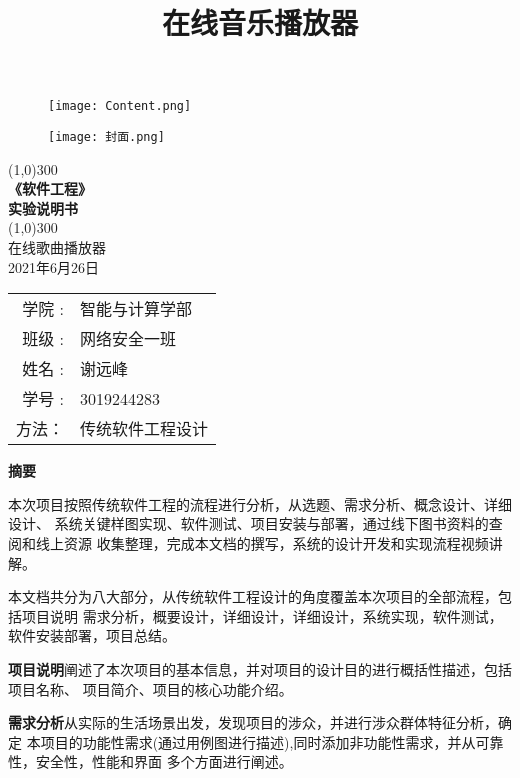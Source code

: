 \documentclass[UTF8,14pt]{article}
\title{在线音乐播放器}
\numberwithin{figure}{subsubsection}
\numberwithin{table}{subsubsection}
\begin{document}
\begin{titlepage}
	\begin{center}
		\begin{figure}[H]
			\centering
			\texttt{[image: Content.png]}
		\end{figure}
		\begin{figure}[H]
			\centering
			\texttt{[image: 封面.png]}
		\end{figure}
		\vspace*{2cm}
		\line(1,0){300}\\
		[-0.2cm]
		\Huge{\bfseries 《软件工程》\\实验说明书}\\
		\vspace*{-0.7cm}
		\line(1,0){300}\\
		\LARGE {在线歌曲播放器\\
			2021年6月26日}\\
		[0.6cm]
		\Large{
			\begin{tabular}{rl}
				学院 :        & 智能与计算学部   \\
				班级 :        & 网络安全一班     \\
				姓名        : & 谢远峰           \\
				学号       :  & 3019244283       \\
				方法：        & 传统软件工程设计
			\end{tabular}
		}
	\end{center}

\end{titlepage}
\clearpage
\centerline{\Large{\bfseries{摘要}}}
\vspace*{0.5cm}
本次项目按照传统软件工程的流程进行分析，从选题、需求分析、概念设计、详细设计、
系统关键样图实现、软件测试、项目安装与部署，通过线下图书资料的查阅和线上资源
收集整理，完成本文档的撰写，系统的设计开发和实现流程视频讲解。

本文档共分为八大部分，从传统软件工程设计的角度覆盖本次项目的全部流程，包括项目说明
需求分析，概要设计，详细设计，详细设计，系统实现，软件测试，软件安装部署，项目总结。

{\bfseries{项目说明}}阐述了本次项目的基本信息，并对项目的设计目的进行概括性描述，包括项目名称、
项目简介、项目的核心功能介绍。

{\bfseries{需求分析}}从实际的生活场景出发，发现项目的涉众，并进行涉众群体特征分析，确定
本项目的功能性需求(通过用例图进行描述),同时添加非功能性需求，并从可靠性，安全性，性能和界面
多个方面进行阐述。
\end{document}
